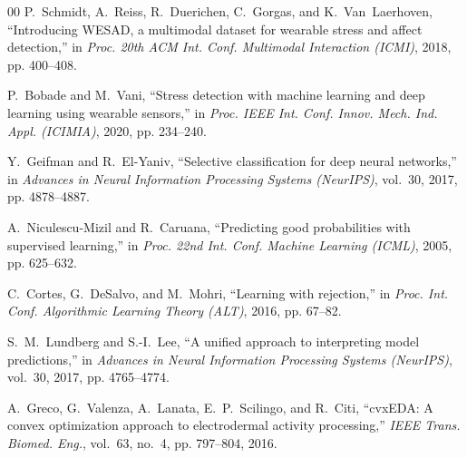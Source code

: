 \documentclass[conference]{IEEEtran}
\begin{document}
\begin{thebibliography}{00}
P.~Schmidt, A.~Reiss, R.~Duerichen, C.~Gorgas, and K.~Van~Laerhoven, ``Introducing WESAD, a multimodal dataset for wearable stress and affect detection,'' in \textit{Proc. 20th ACM Int. Conf. Multimodal Interaction (ICMI)}, 2018, pp. 400--408.

P.~Bobade and M.~Vani, ``Stress detection with machine learning and deep learning using wearable sensors,'' in \textit{Proc. IEEE Int. Conf. Innov. Mech. Ind. Appl. (ICIMIA)}, 2020, pp. 234--240.

Y.~Geifman and R.~El-Yaniv, ``Selective classification for deep neural networks,'' in \textit{Advances in Neural Information Processing Systems (NeurIPS)}, vol.~30, 2017, pp. 4878--4887.

A.~Niculescu-Mizil and R.~Caruana, ``Predicting good probabilities with supervised learning,'' in \textit{Proc. 22nd Int. Conf. Machine Learning (ICML)}, 2005, pp. 625--632.

C.~Cortes, G.~DeSalvo, and M.~Mohri, ``Learning with rejection,'' in \textit{Proc. Int. Conf. Algorithmic Learning Theory (ALT)}, 2016, pp. 67--82.

S.~M.~Lundberg and S.-I.~Lee, ``A unified approach to interpreting model predictions,'' in \textit{Advances in Neural Information Processing Systems (NeurIPS)}, vol.~30, 2017, pp. 4765--4774.

A.~Greco, G.~Valenza, A.~Lanata, E.~P.~Scilingo, and R.~Citi, ``cvxEDA: A convex optimization approach to electrodermal activity processing,'' \textit{IEEE Trans. Biomed. Eng.}, vol.~63, no.~4, pp. 797--804, 2016.
\end{thebibliography}
\end{document}
